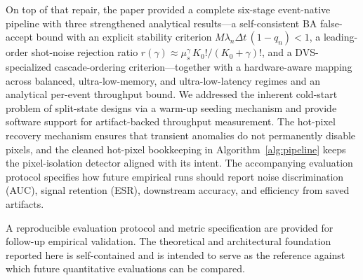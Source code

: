 \documentclass[a4paper,fleqn]{cas-dc}
\begin{document}
On top of that repair, the paper provided a complete six-stage event-native pipeline with three strengthened analytical results---a self-consistent BA false-accept bound with an explicit stability criterion $M\lambda_n\Delta t\,(1-q_n)<1$, a leading-order shot-noise rejection ratio $r(\gamma)\approx \mu_s^\gamma\,K_0!/(K_0+\gamma)!$, and a DVS-specialized cascade-ordering criterion---together with a hardware-aware mapping across balanced, ultra-low-memory, and ultra-low-latency regimes and an analytical per-event throughput bound. We addressed the inherent cold-start problem of split-state designs via a warm-up seeding mechanism and provide software support for artifact-backed throughput measurement. The hot-pixel recovery mechanism ensures that transient anomalies do not permanently disable pixels, and the cleaned hot-pixel bookkeeping in Algorithm~\ref{alg:pipeline} keeps the pixel-isolation detector aligned with its intent. The accompanying evaluation protocol specifies how future empirical runs should report noise discrimination (AUC), signal retention (ESR), downstream accuracy, and efficiency from saved artifacts.

A reproducible evaluation protocol and metric specification are provided for follow-up empirical validation. The theoretical and architectural foundation reported here is self-contained and is intended to serve as the reference against which future quantitative evaluations can be compared.

\printcredits



\end{document}
